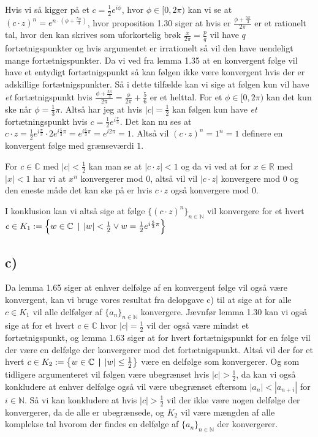 \documentclass{article}
\newcommand{\m}[1]{\mathbb{#1}}
\newcommand{\mC}{\m{C}}
\newcommand{\mR}{\m{R}}
\newcommand{\mN}{\m{N}}
\newcommand{\set}[2]{\left\{ #1 \hspace{0.15cm} \textbf{\textbar}  \hspace{0.15cm} #2 \right\} }
\begin{document}
Hvis vi så kigger på et $c = \frac{1}{2} e^{i\phi}$, hvor $\phi \in [ 0,2\pi )$ kan vi se at $(c \cdot z)^n = e^{n\cdot (\phi + \frac{5\pi}{3})}$, hvor proposition 1.30 siger at
hvis er $ \frac{\phi + \frac{5\pi}{3}}{2\pi}$ er et rationelt tal, hvor den kan skrives som uforkortelig brøk
$\frac{x}{2\pi} = \frac{p}{q}$ vil have $q$ fortætnigspunkter og hvis argumentet er irrationelt så vil den have uendeligt mange fortætnigspunkter.
Da vi ved fra lemma 1.35 at en konvergent følge vil have et entydigt fortætnigspunkt så kan følgen ikke være konvergent hvis der er
adskillige fortætnigspunkter. Så i dette tilfælde kan vi sige at følgen kun vil have \textit{et} fortætnigspunkt hvis
$\frac{\phi + \frac{5\pi}{3}}{2\pi} = \frac{\phi}{2\pi} + \frac{5}{6}$ er et helttal. For et $\phi \in [0, 2\pi)$ kan det kun ske når 
$\phi = \frac{1}{3}\pi$. Altså har jeg at hvis $|c| = \frac{1}{2}$ kan følgen kun have \textit{et} fortætningspunkt hvis $c = \frac{1}{2}e^{i\frac{\pi}{3}}$.
Det kan nu ses at $c \cdot z = \frac{1}{2}e^{i\frac{\pi}{3}} \cdot 2 e^{i \frac{5}{3}\pi} = e^{i \frac{6}{3}\pi} = e^{i2\pi} = 1$.
Altså vil $(c \cdot z)^n = 1^n = 1$ definere en konvergent følge med grænseværdi $1$.

For $c \in \mC$ med $|c| < \frac{1}{2}$ kan man se at
$|c\cdot z| < 1$ og da vi ved at for $x \in \mR$ med $|x| < 1$ har vi at $x^n$ konvergerer mod $0$, altså vil
vil $|c \cdot z|$ konvergere mod $0$ og den eneste måde det kan ske på er hvis $c \cdot z$ også konvergere mod $0$.

I konklusion kan vi altså sige at følge $\{ (c \cdot z)^n \}_{n \in \mN}$ vil konvergere for et hvert $ c \in K_1 := \set{w \in \mC}{|w| < \frac{1}{2} \lor w = \frac{1}{2}e^{i\frac{5}{3}\pi}}$

\subsection*{c)}
Da lemma 1.65 siger at enhver delfølge af en konvergent følge vil også være konvergent,
kan vi bruge vores resultat fra delopgave c) til at sige at for alle $c \in K_1$
vil alle delfølger af $\{ a_n \}_{n \in \mN}$ konvergere. Jævnfør lemma 1.30 kan 
vi også sige at for et hvert $c \in \mC$ hvor $|c| = \frac{1}{2}$ vil der også være mindst
et fortætnigspunkt, og lemma 1.63 siger at for hvert fortætnigspunkt for en følge
vil der være en delfølge der konvergerer mod det fortætnigspunkt. Altså vil 
der for et hvert $c \in K_2 := \set{w \in \mC}{|w| \le \frac{1}{2}}$ være en delfølge som konvergerer. 
Og som tidligere argumenteret vil følgen være ubegrænset hvis $|c| > \frac{1}{2}$, 
da kan vi også konkludere at enhver delfølge også vil være ubegrænset eftersom $|a_n| < |a_{n+i}|$ for $i \in \mN$.
Så vi kan konkludere at hvis $|c| > \frac{1}{2}$ vil der ikke være nogen delfølge der konvergerer,
da de alle er ubegrænsede,
og $K_2$ vil være mængden af alle komplekse tal
hvorom der findes en delfølge af $\{ a_n \}_{n \in \mN}$ der konvergerer.
\end{document}
